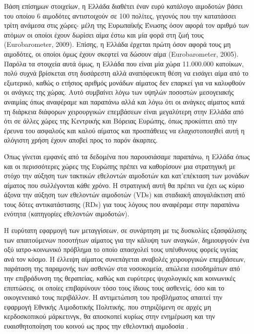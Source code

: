 		Βάση επίσημων στοιχείων, η Ελλάδα διαθέτει έναν ευρύ κατάλογο αιμοδοτών βάσει του οποίου 6 αιμοδότες αντιστοιχούν σε 100 πολίτες, γεγονός που την κατατάσσει τρίτη ανάμεσα στις χώρες- μέλη της Ευρωπαϊκής Ένωσης όσον αφορά τον αριθμό των ατόμων οι οποίοι έχουν δωρίσει αίμα έστω και μία φορά στη ζωή τους  (Eurobarometer, 2009).  Επίσης, η Ελλάδα έρχεται πρώτη όσον αφορά τους μη αιμοδότες, οι οποίοι όμως έχουν σκεφτεί να δώσουν αίμα (Eurobarometer, 2005). Παρόλα τα στοιχεία αυτά όμως, η Ελλάδα που είναι μία χώρα 11.000.000 κατοίκων, πολύ συχνά βρίσκεται στη δυσάρεστη αλλά αναπόφευκτη θέση να εισάγει αίμα από το εξωτερικό, καθώς ο ετήσιος αριθμός μονάδων αίματος δεν επαρκεί για να καλυφθούν οι ανάγκες της χώρας. Αυτό συμβαίνει λόγω των υψηλών ποσοστών μεσογειακής αναιμίας όπως αναφέραμε και παραπάνω αλλά και λόγω ότι οι ανάγκες αίματος κατά τη διάρκεια διάφορων χειρουργικών επεμβάσεων είναι μεγαλύτερη στην Ελλάδα από ότι σε άλλες χώρες της Κεντρικής και Βόρειας Ευρώπης, όπως προκύπτει από την έρευνα του ασφαλούς και
καλού αίματος \cite{Grindon1996} και προσπάθειες να ελαχιστοποιηθεί αυτή η αλόγιστη χρήση έχουν αποβεί προς το παρόν άκαρπες. 

Όπως γίνεται εμφανές από τα δεδομένα που παρουσιάσαμε παραπάνω, η Ελλάδα όπως και οι περισσότερες χώρες της Ευρώπης πρέπει να καθορίσουν μια στρατηγική με στόχο την αύξηση των τακτικών εθελοντών αιμοδοτών και κατ'επέκταση των μονάδων αίματος που συλλέγονται κάθε χρόνο. Η στρατιγική αυτή θα πρέπει να έχει ως κύριο άξονα την αύξηση των εθελοντών αιμοδοτών (VDs) και σταδιακή απογαλάκτιση από τους δότες αντικατάστασης (RDs) για τους λόγους που αναφέραμε στην παραπάνω ενότητα (κατηγορίες εθελοντών αιμοδοτών).

Η ευρύτατη εφαρμογή των μεταγγίσεων, σε συνάρτηση με τις δυσκολίες εξασφάλισης των απαιτούμενων ποσοτήτων αίματος για την κάλυψη των αναγκών, δημιουργούν ένα οξύ ιατρο-κοινωνικό πρόβλημα το οποίο απασχολεί τους υπέυθυνους φορείς υγείας ανά τον κόσμο. Η έλλειψη αίματος συνεπάγεται αναβολές χειρουργικών επεμβάσεων, παράταση της παραμονής των ασθενών στα νοσοκομεία, απώλεια εισοδημάτων από την επιβράδυνση της θεραπείας, καθώς και ευρύτερες ψυχολογικές και κοινωνικές επιπτώσεις, οι οποίες επιβαρύνουν τόσο τους ίδιους τους ασθενείς, όσο και το οικογενειακό τους περιβάλλον. Η αντιμετώπιση του προβλήματος απαιτεί την εφαρμογή Εθνικής Αιμοδοτικής Πολιτικής, που στηριζόμενη σε αρχές μη κερδοσκοπικού μάρκετινγκ, θα αποσκοπεί κυρίως στην ενημέρωση και την ευαισθητοποίηση του κοινού ως προς την εθελοντική αιμοδοσία \cite{Politis}\cite{Marantidou2007}.

